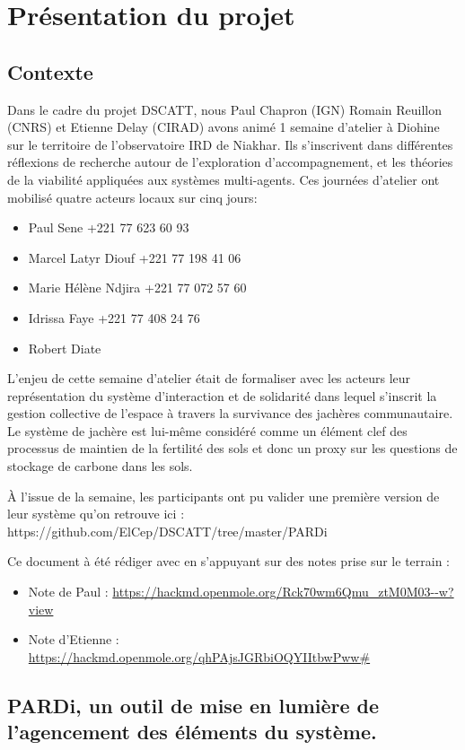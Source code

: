 \chapter{Présentation du projet}


\section{Contexte}

Dans le cadre du projet DSCATT, nous Paul Chapron (IGN) Romain Reuillon (CNRS) et Etienne Delay (CIRAD) avons animé 1 semaine d'atelier à Diohine sur le territoire de l'observatoire IRD de Niakhar. Ils s'inscrivent dans différentes réflexions de recherche autour de l'exploration d'accompagnement, et les théories de la viabilité appliquées aux systèmes multi-agents.
Ces journées d'atelier ont mobilisé quatre acteurs locaux sur cinq jours:
\begin{itemize}
  \item Paul Sene +221 77 623 60 93
  \item Marcel Latyr Diouf +221 77 198 41 06
  \item Marie Hélène Ndjira +221 77 072 57 60
  \item Idrissa Faye +221 77 408 24 76
  \item Robert Diate
\end{itemize}

L'enjeu de cette semaine d'atelier était de formaliser avec les acteurs leur représentation du système d'interaction et de solidarité dans lequel s'inscrit la gestion collective de l'espace à travers la survivance des jachères communautaire. Le système de jachère est lui-même considéré comme un élément clef des processus de maintien de la fertilité des sols et donc un proxy sur les questions de stockage de carbone dans les sols.

À l'issue de la semaine, les participants ont pu valider une première version de leur système qu'on retrouve ici : https://github.com/ElCep/DSCATT/tree/master/PARDi

Ce document à été rédiger avec en s'appuyant sur des notes prise sur le terrain :
\begin{itemize}
  \item Note de Paul : \url{https://hackmd.openmole.org/Rck70wm6Qmu_ztM0M03--w?view}
  \item Note d'Etienne : \url{https://hackmd.openmole.org/qhPAjsJGRbiOQYIItbwPww#}
\end{itemize}


\section{PARDi, un outil de mise en lumière de l'agencement des éléments du système.}


